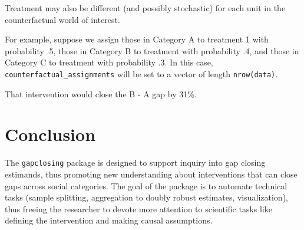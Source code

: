 \documentclass[
]{article}
\newenvironment{Shaded}{\begin{snugshade}}{\end{snugshade}}
\newcommand{\AttributeTok}[1]{\textcolor[rgb]{0.13,0.29,0.53}{#1}}
\newcommand{\DecValTok}[1]{\textcolor[rgb]{0.00,0.00,0.81}{#1}}
\newcommand{\FunctionTok}[1]{\textcolor[rgb]{0.13,0.29,0.53}{\textbf{#1}}}
\newcommand{\NormalTok}[1]{#1}
\newcommand{\OtherTok}[1]{\textcolor[rgb]{0.56,0.35,0.01}{#1}}
\newcommand{\SpecialCharTok}[1]{\textcolor[rgb]{0.81,0.36,0.00}{\textbf{#1}}}
\newcommand{\StringTok}[1]{\textcolor[rgb]{0.31,0.60,0.02}{#1}}
\begin{document}
Treatment may also be different (and possibly stochastic) for each unit in the counterfactual world of interest.

For example, suppose we assign those in Category A to treatment 1 with probability .5, those in Category B to treatment with probability .4, and those in Category C to treatment with probability .3. In this case, \texttt{counterfactual\_assignments} will be set to a vector of length \texttt{nrow(data)}.

\begin{Shaded}
\end{Shaded}

That intervention would close the B - A gap by 31\%.

\section{Conclusion}\label{conclusion}

The \texttt{gapclosing} package is designed to support inquiry into gap closing estimands, thus promoting new understanding about interventions that can close gaps across social categories. The goal of the package is to automate technical tasks (sample splitting, aggregation to doubly robust estimates, visualization), thus freeing the researcher to devote more attention to scientific tasks like defining the intervention and making causal assumptions.
\end{document}
